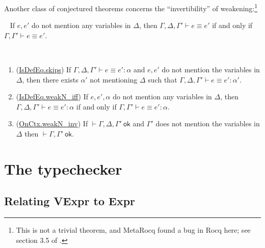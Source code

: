 \documentclass[sigplan,10pt,screen]{acmart}\settopmatter{printfolios=true,printccs=false,printacmref=false}
\newcommand{\ok}{\ \mathsf{ok}}
\newcommand{\code}[1]{\mbox{\ttfamily\small #1}}
\begin{document}
Another class of conjectured theorems concerns the ``invertibility'' of weakening:\footnote{This is not a trivial theorem, and MetaRocq found a bug in Rocq here; see section 3.5 of \cite{sozeau-touring}.}
\begin{conjecture}\label{conj:IsDefEqU.weakN_inv}\ %
  If $e,e'$ do not mention any variables in $\Delta$, then $\Gamma,\Delta,\Gamma'\vdash e\equiv e'$ if and only if $\Gamma,\Gamma'\vdash e\equiv e'$.
\end{conjecture}
\begin{corollary}\ %
  \begin{enumerate}
    \item (\href{https://github.com/digama0/lean4lean/blob/cpp2026/Lean4Lean/Theory/Typing/UniqueTyping.lean#L92-L95}{\code{IsDefEq.skips}}) If $\Gamma,\Delta,\Gamma'\vdash e\equiv e':\alpha$ and $e,e'$ do not mention the variables in $\Delta$, then there exists $\alpha'$ not mentioning $\Delta$ such that $\Gamma,\Delta,\Gamma'\vdash e\equiv e':\alpha'$.
    \item (\href{https://github.com/digama0/lean4lean/blob/cpp2026/Lean4Lean/Theory/Typing/UniqueTyping.lean#L123-L124}{\code{IsDefEq.weakN\_iff}}) If $e,e',\alpha$ do not mention any variables in $\Delta$, then $\Gamma,\Delta,\Gamma'\vdash e\equiv e':\alpha$ if and only if $\Gamma,\Gamma'\vdash e\equiv e':\alpha$.
    \item (\href{https://github.com/digama0/lean4lean/blob/cpp2026/Lean4Lean/Theory/Typing/UniqueTyping.lean#L110-L111}{\code{OnCtx.weakN\_inv}}) If $\vdash\Gamma,\Delta,\Gamma'\ok$ and $\Gamma'$ does not mention the variables in $\Delta$ then $\vdash\Gamma,\Gamma'\ok$.
  \end{enumerate}
\end{corollary}

\section{The typechecker}\label{sec:typeck}
\subsection{Relating VExpr to Expr}\label{sec:typeck-TrExpr}
\end{document}
